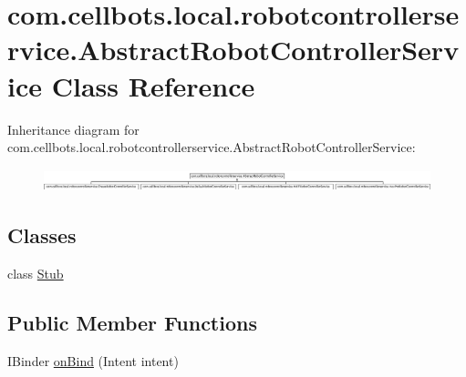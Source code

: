\hypertarget{classcom_1_1cellbots_1_1local_1_1robotcontrollerservice_1_1_abstract_robot_controller_service}{\section{com.\-cellbots.\-local.\-robotcontrollerservice.\-Abstract\-Robot\-Controller\-Service Class Reference}
\label{classcom_1_1cellbots_1_1local_1_1robotcontrollerservice_1_1_abstract_robot_controller_service}
}
Inheritance diagram for com.\-cellbots.\-local.\-robotcontrollerservice.\-Abstract\-Robot\-Controller\-Service\-:\begin{figure}[H]
\begin{center}
\leavevmode
\includegraphics[height=0.646651cm]{classcom_1_1cellbots_1_1local_1_1robotcontrollerservice_1_1_abstract_robot_controller_service}
\end{center}
\end{figure}
\subsection*{Classes}
\begin{DoxyCompactItemize}
\item 
class \hyperlink{classcom_1_1cellbots_1_1local_1_1robotcontrollerservice_1_1_abstract_robot_controller_service_1_1_stub}{Stub}
\end{DoxyCompactItemize}
\subsection*{Public Member Functions}
\begin{DoxyCompactItemize}
\item 
I\-Binder \hyperlink{classcom_1_1cellbots_1_1local_1_1robotcontrollerservice_1_1_abstract_robot_controller_service_aa717aea364f2427147d99ce9e0dcd56a}{on\-Bind} (Intent intent)
\end{DoxyCompactItemize}
